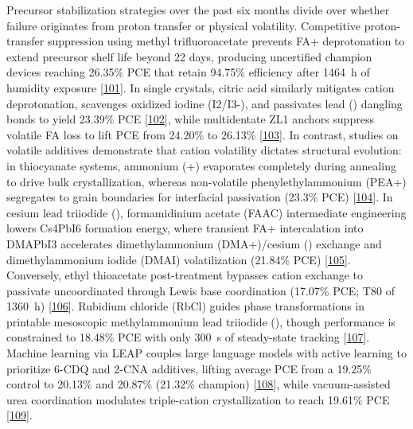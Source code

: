 \documentclass[
  11pt,
]{article}
\begin{document}
Precursor stabilization strategies over the past six months divide over
whether failure originates from proton transfer or physical volatility.
Competitive proton-transfer suppression using methyl trifluoroacetate
prevents FA+ deprotonation to extend precursor shelf life beyond 22
days, producing uncertified champion devices reaching 26.35\% PCE that
retain 94.75\% efficiency after \qty{1464}{\hour} of humidity exposure
{[}\href{https://doi.org/10.1038/s41467-026-73620-0}{101}{]}. In single
crystals, citric acid similarly mitigates cation deprotonation,
scavenges oxidized iodine (I2/I3-), and passivates lead ()
dangling bonds to yield 23.39\% PCE
{[}\href{https://doi.org/10.1002/aenm.70939}{102}{]}, while multidentate
ZL1 anchors suppress volatile FA loss to lift PCE from 24.20\% to
26.13\% {[}\href{https://doi.org/10.1007/s40820-026-02098-8}{103}{]}. In
contrast, studies on volatile additives demonstrate that cation
volatility dictates structural evolution: in thiocyanate systems,
ammonium (+) evaporates completely during annealing to drive
bulk crystallization, whereas non-volatile phenylethylammonium (PEA+)
segregates to grain boundaries for interfacial passivation (23.3\% PCE)
{[}\href{https://doi.org/10.1021/acsaem.6c01329}{104}{]}. In cesium lead
triiodide (), formamidinium acetate (FAAC) intermediate
engineering lowers Cs4PbI6 formation energy, where transient FA+
intercalation into DMAPbI3 accelerates dimethylammonium (DMA+)/cesium
() exchange and dimethylammonium iodide (DMAI) volatilization
(21.84\% PCE)
{[}\href{https://doi.org/10.1021/acs.jpclett.6c01395}{105}{]}.
Conversely, ethyl thioacetate post-treatment bypasses cation exchange to
passivate uncoordinated  through Lewis base coordination
(17.07\% PCE; T80 of \qty{1360}{\hour})
{[}\href{https://doi.org/10.1021/acsaem.5c04098}{106}{]}. Rubidium
chloride (RbCl) guides phase transformations in printable mesoscopic
methylammonium lead triiodide (), though performance is
constrained to 18.48\% PCE with only \qty{300}{\second} of steady-state
tracking {[}\href{https://doi.org/10.1002/solr.70363}{107}{]}. Machine
learning via LEAP couples large language models with active learning to
prioritize 6-CDQ and 2-CNA additives, lifting average PCE from a 19.25\%
control to 20.13\% and 20.87\% (21.32\% champion)
{[}\href{https://doi.org/10.48550/arxiv.2605.20242}{108}{]}, while
vacuum-assisted urea coordination modulates triple-cation
crystallization to reach 19.61\% PCE
{[}\href{https://doi.org/10.1002/solr.202500906}{109}{]}.
\end{document}
